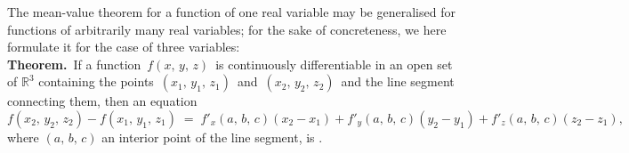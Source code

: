 \documentclass[12pt]{article}
\theoremstyle{definition}
\begin{document}
The mean-value theorem for a function of one real variable may be generalised for functions of arbitrarily many real variables; for the sake of concreteness, we here formulate it for the case of three variables:\\


\textbf{Theorem.}\, If a function \,$f(x,\,y,\,z)$\, is continuously differentiable in an open set of 
$\mathbb{R}^3$ containing the points \,$(x_1,\,y_1,\,z_1)$\, and \,$(x_2,\,y_2,\,z_2)$\, and the line segment connecting them, then an equation
$$f(x_2,\,y_2,\,z_2)-f(x_1,\,y_1,\,z_1) \;=\; 
f'_x(a,\,b,\,c)(x_2\!-\!x_1)+f'_y(a,\,b,\,c)(y_2\!-\!y_1)+f'_z(a,\,b,\,c)(z_2\!-\!z_1),$$
where $(a,\,b,\,c)$ an interior point of the line segment, is .\\



\end{document}

